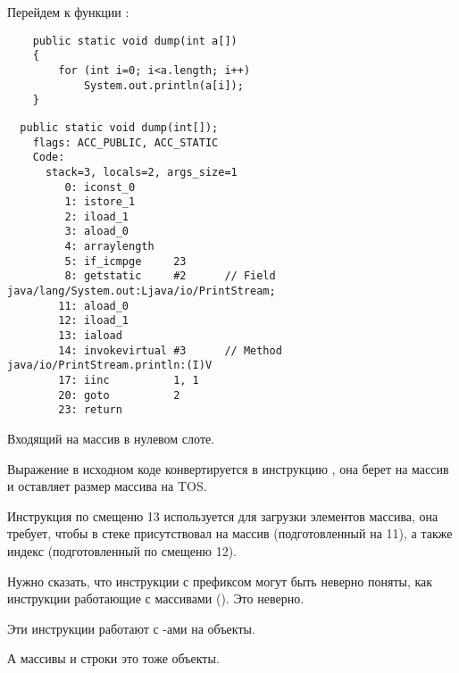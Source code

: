 Перейдем к функции :

\begin{lstlisting}
	public static void dump(int a[])
	{
		for (int i=0; i<a.length; i++)
			System.out.println(a[i]);
	}
\end{lstlisting}

\begin{lstlisting}
  public static void dump(int[]);
    flags: ACC_PUBLIC, ACC_STATIC
    Code:
      stack=3, locals=2, args_size=1
         0: iconst_0      
         1: istore_1      
         2: iload_1       
         3: aload_0       
         4: arraylength   
         5: if_icmpge     23
         8: getstatic     #2      // Field java/lang/System.out:Ljava/io/PrintStream;
        11: aload_0       
        12: iload_1       
        13: iaload        
        14: invokevirtual #3      // Method java/io/PrintStream.println:(I)V
        17: iinc          1, 1
        20: goto          2
        23: return        
\end{lstlisting}

Входящий  на массив в нулевом слоте.

Выражение  в исходном коде конвертируется в инструкцию ,
она берет  на массив и оставляет размер массива на \ac{TOS}.

Инструкция  по смещеню 13 используется для загрузки элементов массива, 
она требует, чтобы в стеке присутствовал  на массив
(подготовленный  на 11), 
а также индекс (подготовленный  по смещеню 12).

Нужно сказать, что инструкции с префиксом  могут быть неверно поняты, 
как инструкции работающие с массивами ().
Это неверно.

Эти инструкции работают с -ами на объекты.

А массивы и строки это тоже объекты.
